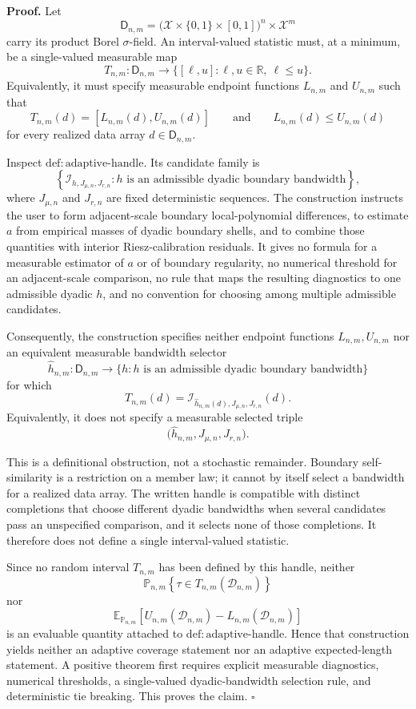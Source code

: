 \textbf{Proof.}
Let
\[
\mathsf D_{n,m}
=\bigl(\mathcal X\times\{0,1\}\times[0,1]\bigr)^n\times\mathcal X^m
\]
carry its product Borel \(\sigma\)-field. An interval-valued statistic must, at a minimum, be a single-valued measurable map
\[
T_{n,m}:\mathsf D_{n,m}\longrightarrow
\bigl\{[\ell,u]:\ell,u\in\mathbb R,\ \ell\le u\bigr\}.
\]
Equivalently, it must specify measurable endpoint functions \(L_{n,m}\) and \(U_{n,m}\) such that
\[
T_{n,m}(d)=[L_{n,m}(d),U_{n,m}(d)]
\qquad\text{and}\qquad
L_{n,m}(d)\le U_{n,m}(d)
\]
for every realized data array \(d\in\mathsf D_{n,m}\).

Inspect \(\mathrm{def:adaptive\text{-}handle}\). Its candidate family is
\[
\left\{\mathcal I_{h,J_{\mu,n},J_{r,n}}:
h\text{ is an admissible dyadic boundary bandwidth}\right\},
\]
where \(J_{\mu,n}\) and \(J_{r,n}\) are fixed deterministic sequences. The construction instructs the user to form adjacent-scale boundary local-polynomial differences, to estimate \(a\) from empirical masses of dyadic boundary shells, and to combine those quantities with interior Riesz-calibration residuals. It gives no formula for a measurable estimator of \(a\) or of boundary regularity, no numerical threshold for an adjacent-scale comparison, no rule that maps the resulting diagnostics to one admissible dyadic \(h\), and no convention for choosing among multiple admissible candidates.

Consequently, the construction specifies neither endpoint functions \(L_{n,m},U_{n,m}\) nor an equivalent measurable bandwidth selector
\[
\widehat h_{n,m}:\mathsf D_{n,m}\longrightarrow
\{h:h\text{ is an admissible dyadic boundary bandwidth}\}
\]
for which
\[
T_{n,m}(d)
=\mathcal I_{\widehat h_{n,m}(d),J_{\mu,n},J_{r,n}}(d).
\]
Equivalently, it does not specify a measurable selected triple
\[
\bigl(\widehat h_{n,m},J_{\mu,n},J_{r,n}\bigr).
\]

This is a definitional obstruction, not a stochastic remainder. Boundary self-similarity is a restriction on a member law; it cannot by itself select a bandwidth for a realized data array. The written handle is compatible with distinct completions that choose different dyadic bandwidths when several candidates pass an unspecified comparison, and it selects none of those completions. It therefore does not define a single interval-valued statistic.

Since no random interval \(T_{n,m}\) has been defined by this handle, neither
\[
\mathbb P_{n,m}\!\left\{\tau\in T_{n,m}(\mathcal D_{n,m})\right\}
\]
nor
\[
\mathbb E_{\mathbb P_{n,m}}\!\left[
U_{n,m}(\mathcal D_{n,m})-L_{n,m}(\mathcal D_{n,m})
\right]
\]
is an evaluable quantity attached to \(\mathrm{def:adaptive\text{-}handle}\). Hence that construction yields neither an adaptive coverage statement nor an adaptive expected-length statement. A positive theorem first requires explicit measurable diagnostics, numerical thresholds, a single-valued dyadic-bandwidth selection rule, and deterministic tie breaking. This proves the claim. \(\square\)